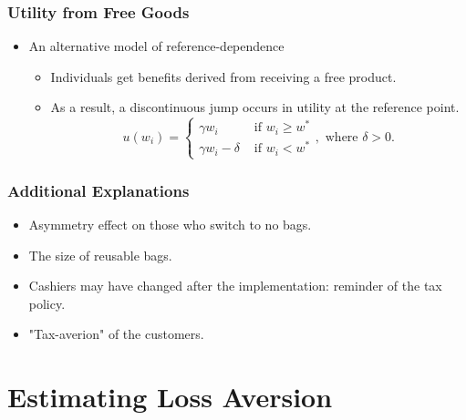 \documentclass[dvipdfmx,11pt]{beamer}
\begin{document}
\begin{frame}\frametitle{Utility from Free Goods}
  \begin{itemize}
    \item An alternative model of reference-dependence
    \begin{itemize}
      \item Individuals get benefits derived from receiving a free product.
      \item As a result, a discontinuous jump occurs in utility at the reference point.
      \[
      u(w_i) = \begin{cases}
        \gamma w_i & \text{ if } w_i \geq w^* \\
        \gamma w_i - \delta & \text{ if } w_{i} < w^*
    \end{cases}, \text{ where } \delta > 0.
      \]
    \end{itemize}
  \end{itemize}
\end{frame}

\begin{frame}\frametitle{Additional Explanations}
  \begin{itemize}
    \item Asymmetry effect on those who switch to no bags.
    \item The size of reusable bags.
    \item Cashiers may have changed after the implementation: reminder of the tax policy.
    \item "Tax-averion" of the customers.
  \end{itemize}
\end{frame}

\section{Estimating Loss Aversion}
\frame{\sectionpage}
\end{document}
